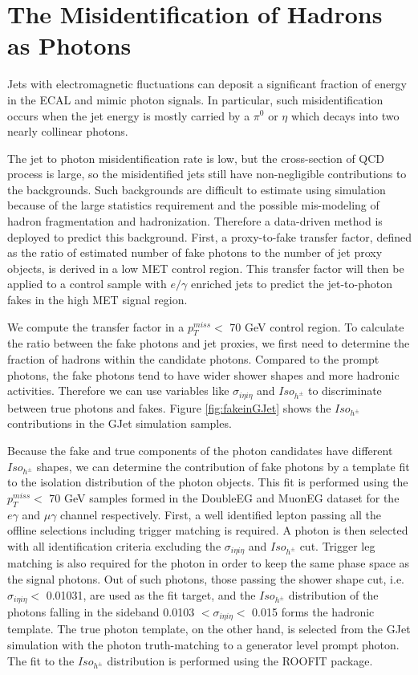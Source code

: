 \documentclass[thesis.tex]{subfiles}
\renewcommand\_{\textunderscore\allowbreak}
\begin{document}
\section{The Misidentification of Hadrons as Photons}\label{sec:jetfakepho}
Jets with electromagnetic fluctuations can deposit a significant fraction of energy in the ECAL and mimic photon signals. In particular, such misidentification occurs when the jet energy is mostly carried by a $\pi^0$ or $\eta$ which decays into two nearly collinear photons. 

The jet to photon misidentification rate is low, but the cross-section of QCD process is large, so the misidentified jets still have non-negligible contributions to the backgrounds. Such backgrounds are difficult to estimate using simulation because of the large statistics requirement and the possible mis-modeling of hadron fragmentation and hadronization. Therefore a data-driven method is deployed to predict this background. First, a proxy-to-fake transfer factor, defined as the ratio of estimated number of fake photons to the number of jet proxy objects, is derived in a low MET control region. This transfer factor will then be applied to a control sample with $e/\gamma$ enriched jets to predict the jet-to-photon fakes in the high MET signal region. 

We compute the transfer factor in a $p_T^{miss} < $ 70 GeV control region. To calculate the ratio between the fake photons and jet proxies, we first need to determine the fraction of hadrons within the candidate photons.  Compared to the prompt photons, the fake photons tend to have wider shower shapes and more hadronic activities. Therefore we can use variables like $\sigma_{i\eta i\eta}$ and $Iso_{h^\pm}$ to discriminate between true photons and fakes. Figure \ref{fig:fakeinGJet} shows the $Iso_{h^\pm}$ contributions in the GJet simulation samples. 

Because the fake and true components of the photon candidates have different $Iso_{h^\pm}$ shapes, we can determine the contribution of fake photons by a template fit to the isolation distribution of the photon objects. This fit is performed using the $p_T^{miss} <$ 70 GeV samples formed in the DoubleEG and MuonEG dataset for the $e\gamma$ and $\mu\gamma$ channel respectively. First, a well identified lepton passing all the offline selections including trigger matching is required. A photon is then selected with all identification criteria excluding the $\sigma_{i\eta i\eta}$ and $Iso_{h^\pm}$ cut. Trigger leg matching is also required for the photon in order to keep the same phase space as the signal photons. Out of such photons, those passing the shower shape cut, i.e. $\sigma_{i\eta i\eta} <$ 0.01031, are used as the fit target, and the $Iso_{h^\pm}$ distribution of the photons falling in the sideband 0.0103 $< \sigma_{i\eta i\eta} <$ 0.015 forms the hadronic template. The true photon template, on the other hand, is selected from the GJet simulation with the photon truth-matching to a generator level prompt photon. The fit to the $Iso_{h^\pm}$ distribution is performed using the ROOFIT package. 
\end{document}
